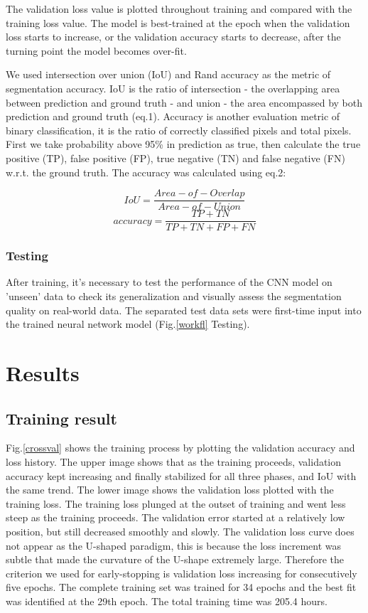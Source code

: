 \documentclass[draft,linenumbers]{agujournal2018}
\begin{document}
The validation loss value is plotted throughout training and compared with the training loss value. The model is best-trained at the epoch when the validation loss starts to increase, or the validation accuracy starts to decrease, after the turning point the model becomes over-fit. 
 
We used intersection over union (IoU) and Rand accuracy as the metric of segmentation accuracy. IoU is the ratio of intersection - the overlapping area between prediction and ground truth - and union - the area encompassed by both prediction and ground truth (eq.1). Accuracy is another evaluation metric of binary classification, it is the ratio of correctly classified pixels and total pixels. First we take probability above 95\% in prediction as true, then calculate the true positive (TP), false positive (FP), true negative (TN) and false negative (FN) w.r.t. the ground truth. The accuracy was calculated using eq.2:

\begin{equation}
    IoU=\frac{Area-of-Overlap}{Area-of-Union}
\end{equation}
\begin{equation}
    accuracy=\frac{TP+TN}{TP+TN+FP+FN}
\end{equation}

\subsubsection{Testing}
After training, it's necessary to test the performance of the CNN model on 'unseen' data to check its generalization and visually assess the segmentation quality on real-world data. The separated test data sets were first-time input into the trained neural network model (Fig.\ref{workfl} Testing). 

\section{Results}
\subsection{Training result}
Fig.\ref{crossval} shows the training process by plotting the validation accuracy and loss history. The upper image shows that as the training proceeds, validation accuracy kept increasing and finally stabilized for all three phases, and IoU with the same trend. The lower image shows the validation loss plotted with the training loss. The training loss plunged at the outset of training and went less steep as the training proceeds. The validation error started at a relatively low position, but still decreased smoothly and slowly. The validation loss curve does not appear as the U-shaped paradigm, this is because the loss increment was subtle that made the curvature of the U-shape extremely large. Therefore the criterion we used for early-stopping is validation loss increasing for consecutively five epochs. The complete training set was trained for 34 epochs and the best fit was identified at the 29th epoch. The total training time was 205.4 hours. 
\end{document}
